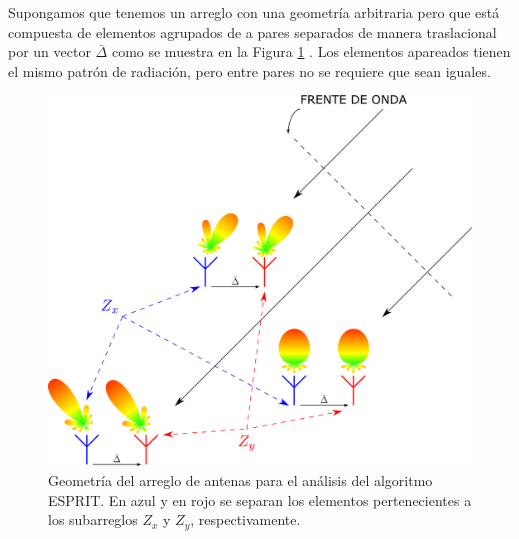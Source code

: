 Supongamos que tenemos un arreglo con una geometría arbitraria pero que está compuesta de elementos agrupados de a pares separados de manera traslacional por un vector $\bar{\Delta}$ como se muestra en la Figura \ref{fig:doaest_esprit_geometry} \cite{bib:esprit_roy}. Los elementos apareados tienen el mismo patrón de radiación, pero entre pares no se requiere que sean iguales.
\begin{figure}[ht!]
    \centering
    \includegraphics[width=0.7\linewidth]{images/03-DOAEst/esprit.png}
    \caption{Geometría del arreglo de antenas para el análisis del algoritmo ESPRIT. En azul y en rojo se separan los elementos pertenecientes a los subarreglos $Z_x$ y $Z_y$, respectivamente.}
    \label{fig:doaest_esprit_geometry}
\end{figure}

